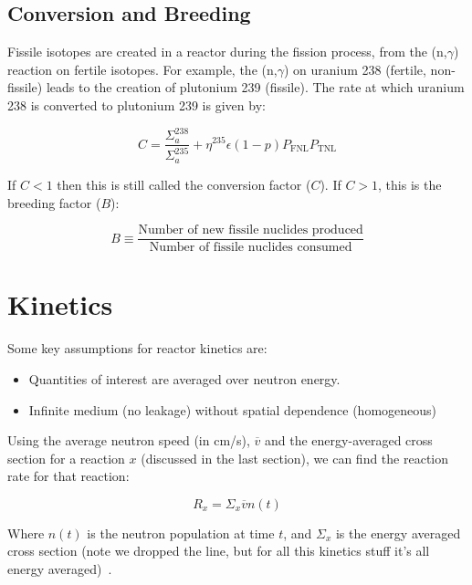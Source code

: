 \documentclass[letter]{article}
\begin{document}
\subsection{Conversion and Breeding}

Fissile isotopes are created in a reactor during the fission process,
from the (n,$\gamma$) reaction on fertile isotopes. For example, the
(n,$\gamma$) on uranium 238 (fertile, non-fissile) leads to the
creation of plutonium 239 (fissile). The rate at which uranium 238 is
converted to plutonium 239 is given by:

\begin{equation*}
  C=\frac{\Sigma^{238}_a}{\Sigma^{235}_a}+\eta^{235}\epsilon{}(1-p)P_{\text{FNL}}P_{\text{TNL}}
\end{equation*}

If $C<1$ then this is still called the conversion factor ($C$). If
$C>1$, this is the breeding factor ($B$):

\begin{equation*}
  B\equiv \frac{\text{Number of new fissile nuclides
      produced}}{\text{Number of fissile nuclides consumed}}
\end{equation*}

\section{Kinetics}

Some key assumptions for reactor kinetics are:
\begin{itemize}
\item Quantities of interest are averaged over neutron energy.
\item Infinite medium (no leakage) without spatial dependence (homogeneous)
\end{itemize}
\cite[Lec. 14]{lecture}

Using the average neutron speed (in cm/s), $\overline{v}$ and the
energy-averaged cross section for a reaction $x$ (discussed in the
last section), we can find the reaction rate for that reaction:

\begin{equation*}
  R_x=\Sigma_x\overline{v}n(t)
\end{equation*}

Where $n(t)$ is the neutron population at time $t$, and $\Sigma_x$ is
the energy averaged cross section (note we dropped the line, but for
all this kinetics stuff it's all energy
averaged)~\cite[Lec. 14]{lecture}.
\end{document}
